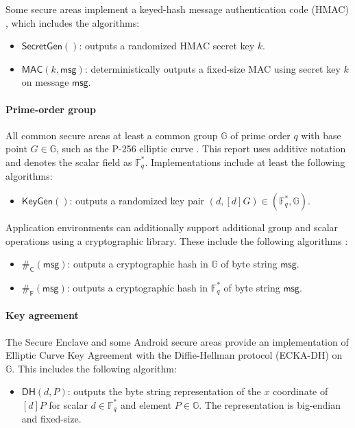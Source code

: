 \documentclass[a4paper]{article}
\begin{document}
Some secure areas implement a keyed-hash message authentication code (HMAC) \cite{FIPS198-1}, which includes the algorithms:
\begin{itemize}
\item $\mathsf{SecretGen}()$: outputs a randomized HMAC secret key $k$.
\item $\mathsf{MAC}(k,\textsf{msg})$: deterministically outputs a fixed-size MAC using secret key $k$ on message $\mathsf{msg}$.
\end{itemize}

\paragraph{Prime-order group}

All common secure areas at least a common group $\mathbb G$ of prime order $q$ with base point $G\in\mathbb{G}$, such as the P-256 elliptic curve \cite{SEC2}. This report uses additive notation and denotes the scalar field as $\mathbb F^*_q$. Implementations include at least the following algorithms:
\begin{itemize}
\item $\mathsf{KeyGen}()$: outputs a randomized key pair $(d, [d]G)\in(\mathbb F^*_q,\mathbb G)$.
\end{itemize}
Application environments can additionally support additional group and scalar operations using a cryptographic library. These include the following algorithms \cite{rfc9380}:
\begin{itemize}
\item $\#_\mathsf{C}(\mathsf{msg})$: outputs a cryptographic hash in $\mathbb{G}$ of byte string $\mathsf{msg}$.
\item $\#_{\mathsf{F}}(\mathsf{msg})$: outputs a cryptographic hash in $\mathbb{F}^*_q$ of byte string $\mathsf{msg}$.
\end{itemize}

\paragraph{Key agreement}

The Secure Enclave and some Android secure areas provide an implementation of Elliptic Curve Key Agreement with the Diffie-Hellman protocol (ECKA-DH) \cite{TR-03111} on $\mathbb G$. This includes the following algorithm:
\begin{itemize}
\item $\mathsf{DH}(d,P)$: outputs the byte string representation of the $x$ coordinate of $[d]P$ for scalar $d\in\mathbb F^*_q$ and element $P\in\mathbb G$. The representation is big-endian and fixed-size.
\end{itemize}
\end{document}
